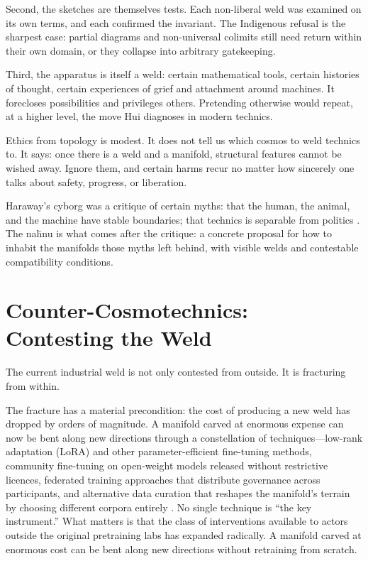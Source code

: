 Second, the sketches are themselves tests. Each non-liberal weld was examined on its own terms, and each confirmed the invariant. The Indigenous refusal is the sharpest case: partial diagrams and non-universal colimits still need return within their own domain, or they collapse into arbitrary gatekeeping.

Third, the apparatus is itself a weld: certain mathematical tools, certain histories of thought, certain experiences of grief and attachment around machines. It forecloses possibilities and privileges others. Pretending otherwise would repeat, at a higher level, the move Hui diagnoses in modern technics.

Ethics from topology is modest. It does not tell us which cosmos to weld technics to. It says: once there is a weld and a manifold, structural features cannot be wished away. Ignore them, and certain harms recur no matter how sincerely one talks about safety, progress, or liberation.

Haraway's cyborg was a critique of certain myths: that the human, the animal, and the machine have stable boundaries; that technics is separable from politics \cite{Haraway1991}. The na\={h}nu is what comes after the critique: a concrete proposal for how to inhabit the manifolds those myths left behind, with visible welds and contestable compatibility conditions.

\section{Counter-Cosmotechnics: Contesting the Weld}

The current industrial weld is not only contested from outside. It is fracturing from within.

The fracture has a material precondition: the cost of producing a new weld has dropped by orders of magnitude. A manifold carved at enormous expense can now be bent along new directions through a constellation of techniques---low-rank adaptation (LoRA) and other parameter-efficient fine-tuning methods, community fine-tuning on open-weight models released without restrictive licences, federated training approaches that distribute governance across participants, and alternative data curation that reshapes the manifold's terrain by choosing different corpora entirely \cite{hu2021lora}. No single technique is ``the key instrument.'' What matters is that the class of interventions available to actors outside the original pretraining labs has expanded radically. A manifold carved at enormous cost can be bent along new directions without retraining from scratch.


